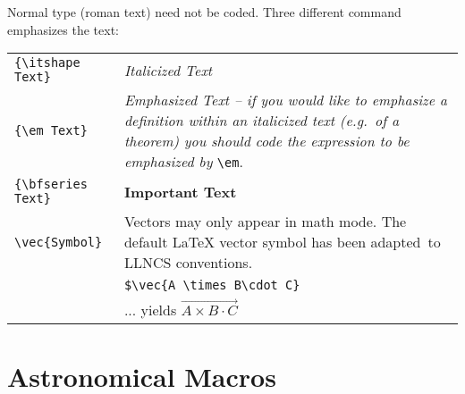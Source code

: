 \documentclass[usenatbib]{tjaa}
\begin{document}
Normal type (roman text) need not be coded. Three different command
emphasizes the text:
\begin{flushleft}
\begin{tabular}{@{}p{}p{}}
\verb|{\itshape Text}|   & {\itshape Italicized Text}\\
\verb|{\em Text}|   & {\em Emphasized Text --
   if you would like to emphasize a {\em definition} within an
   italicized text (e.g.\ of a {\em theorem}) you should code the
   expression to be emphasized by} \verb|\em|.\\
\verb|{\bfseries Text}|& {\bfseries Important Text}\\
\verb|\vec{Symbol}| & Vectors may only appear in math mode. The default
   \LaTeX{} vector symbol has been adapted\footnotemark\
   to LLNCS conventions.\\[2pt]
 & \verb|$\vec{A \times B\cdot C}|\\
 & ... yields $\vec{A\times B\cdot C}$
\end{tabular}
\end{flushleft}

\section{Astronomical Macros}
\end{document}
